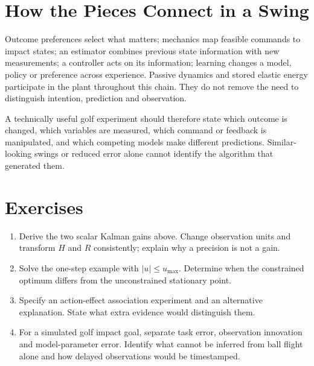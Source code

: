 \section{How the Pieces Connect in a Swing}

Outcome preferences select what matters; mechanics map feasible commands to
impact states; an estimator combines previous state information with new
measurements; a controller acts on its information; learning changes a model,
policy or preference across experience. Passive dynamics and stored elastic
energy participate in the plant throughout this chain. They do not remove the
need to distinguish intention, prediction and observation.

A technically useful golf experiment should therefore state which outcome is
changed, which variables are measured, which command or feedback is manipulated,
and which competing models make different predictions. Similar-looking swings
or reduced error alone cannot identify the algorithm that generated them.

\section*{Exercises}
\begin{enumerate}
 \item Derive the two scalar Kalman gains above. Change observation units and
 transform $H$ and $R$ consistently; explain why a precision is not a gain.
 \item Solve the one-step example with $|u|\leq u_{\max}$. Determine when the
 constrained optimum differs from the unconstrained stationary point.
 \item Specify an action-effect association experiment and an alternative
 explanation. State what extra evidence would distinguish them.
 \item For a simulated golf impact goal, separate task error, observation
 innovation and model-parameter error. Identify what cannot be inferred from
 ball flight alone and how delayed observations would be timestamped.
\end{enumerate}
